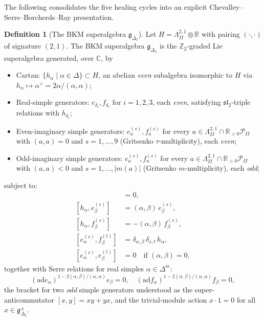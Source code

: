 \documentclass[11pt]{article}
\theoremstyle{definition}
\newtheorem{definition}[theorem]{Definition}
\providecommand{\C}{\mathbb{C}}
\providecommand{\Z}{\mathbb{Z}}
\providecommand{\R}{\mathbb{R}}
\providecommand{\g}{\mathfrak{g}}
\providecommand{\ad}{\mathrm{ad}}
\providecommand{\LII}{\Lambda^{2,1}_{I\!I}}
\providecommand{\PII}{\mathcal{P}_{I\!I}}
\providecommand{\dre}{\Delta^{\mathrm{re}}}
\providecommand{\Deltafive}{\Delta_5}
\begin{document}
The following consolidates the five healing cycles into an explicit
Chevalley--Serre--Borcherds--Ray presentation.

\begin{definition}[The BKM superalgebra $\g_{\Deltafive}$]
\label{def:g-delta5-presentation}
Let $H=\LII\otimes\R$ with pairing $(\cdot,\cdot)$ of signature $(2,1)$.
The BKM superalgebra $\g_{\Deltafive}$ is the $\Z_2$-graded Lie
superalgebra generated, over $\C$, by
\begin{itemize}
\item Cartan: $\{h_\alpha\mid\alpha\in\Delta\}\subset H$, an abelian
      \emph{even} subalgebra isomorphic to $H$ via
      $h_\alpha\mapsto\alpha^\vee=2\alpha/(\alpha,\alpha)$;
\item Real-simple generators: $e_{\delta_i}, f_{\delta_i}$ for
      $i=1,2,3$, each \emph{even}, satisfying
      $\mathfrak{sl}_2$-triple relations with $h_{\delta_i}$;
\item Even-imaginary simple generators:
      $e_a^{(s)}, f_a^{(s)}$ for every $a\in\LII\cap\R_{>0}\PII$ with
      $(a,a)=0$ and $s=1,\dots,9$ (Gritsenko $\tau$-multiplicity),
      each \emph{even};
\item Odd-imaginary simple generators:
      $e_a^{(s)}, f_a^{(s)}$ for every $a\in\LII\cap\R_{>0}\PII$ with
      $(a,a)<0$ and $s=1,\dots,|m(a)|$ (Gritsenko $m$-multiplicity),
      each \emph{odd};
\end{itemize}
subject to:
\begin{align*}
  [h_\alpha, h_\beta] &= 0,\\
  [h_\alpha, e_\beta^{(s)}] &= (\alpha,\beta)\,e_\beta^{(s)},\\
  [h_\alpha, f_\beta^{(s)}] &= -(\alpha,\beta)\,f_\beta^{(s)},\\
  [e_\alpha^{(s)}, f_\beta^{(t)}] &= \delta_{\alpha,\beta}\,\delta_{s,t}\,h_\alpha,\\
  [e_\alpha^{(s)}, e_\beta^{(t)}] &= 0 \quad \text{if }(\alpha,\beta)=0,
\end{align*}
together with Serre relations for real simples $\alpha\in\dre$:
\[
  (\ad e_\alpha)^{1-2(\alpha,\beta)/(\alpha,\alpha)}e_\beta=0,\quad
  (\ad f_\alpha)^{1-2(\alpha,\beta)/(\alpha,\alpha)}f_\beta=0,
\]
the bracket for two \emph{odd} simple generators understood as the
super-anticommutator $[x,y]=xy+yx$, and the trivial-module action
$x\cdot 1=0$ for all $x\in\g_{\Deltafive}^{\pm}$.
\end{definition}
\end{document}
